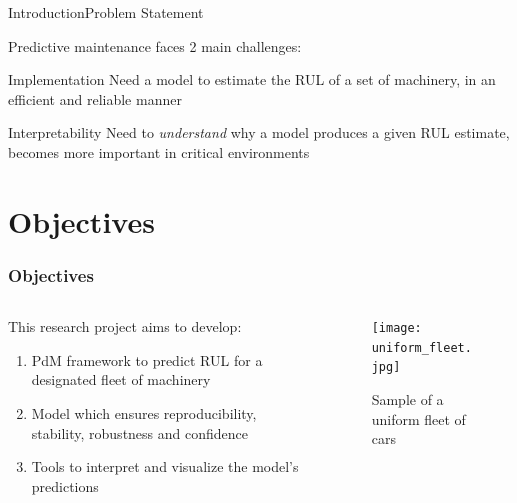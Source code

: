 \documentclass{beamer}
\begin{document}
        \begin{frame}{Introduction}{Problem Statement}

            Predictive maintenance faces 2 main challenges:
            \begin{block}{Implementation}
                Need a model to estimate the RUL of a set of machinery, in an efficient and reliable manner
            \end{block}

            \begin{alertblock}{Interpretability}
                Need to \textit{understand} why a model produces a given RUL estimate, becomes more important in critical environments
            \end{alertblock}

        \end{frame}

    \section{Objectives}

        \begin{frame}
            \frametitle{Objectives}
            \begin{columns}
                \begin{column}{0.45\textwidth}
                    This research project aims to develop:
                    \begin{enumerate}
                        \item PdM framework to predict RUL for a designated fleet of machinery
                        \item Model which ensures reproducibility, stability, robustness and confidence
                        \item Tools to interpret and visualize the model's predictions
                    \end{enumerate}
                \end{column}
                \begin{column}{0.55\textwidth}
                    \begin{figure}[!htbp]
                        \centering
                        \texttt{[image: uniform\_fleet.jpg]}
                        \caption{Sample of a uniform fleet of cars}
                    \end{figure}
                \end{column}
            \end{columns}
        \end{frame}
\end{document}
